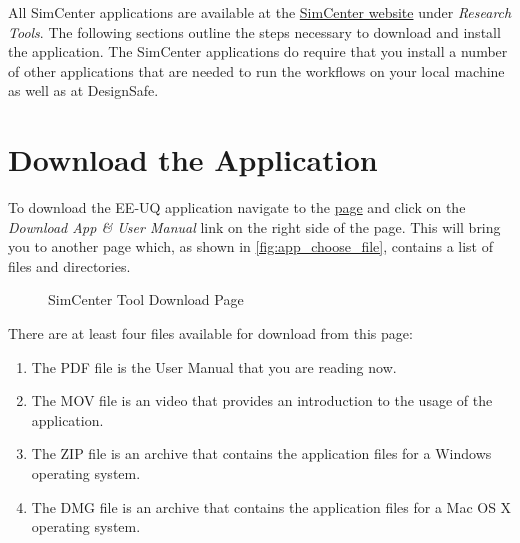 All SimCenter applications are available at the \href{https://simcenter.designsafe-ci.org/research-tools/overview/}{SimCenter website} under \emph{Research Tools}. The following sections outline the steps necessary to download and install the  \thisSoftware  application. The SimCenter applications do require that you install a number of other applications that are needed to run the workflows on your local machine as well as at DesignSafe. \\


\section{Download the Application}


To download the EE-UQ application navigate to the \href{\thisSoftwarePage}{\thisSoftware page}  and click on the \emph{Download App \& User Manual} link on the right side of the page. This will bring you to another page which, as shown in \autoref{fig:app_choose_file},  contains a list of files and directories. 


\begin{figure}[!htbp]
  \caption{SimCenter Tool Download Page}
  \label{fig:app_choose_file}
\end{figure}

There are at least four files available for download from this page: 
\begin{enumerate}
    \item The PDF file is the User Manual that you are reading now.
    \item The MOV file is an video that provides an introduction to the usage of the application.
    \item The ZIP file is an archive that contains the application files for a Windows operating system.
    \item The DMG file is an archive that contains the application files for a Mac OS X operating system.
\end{enumerate}


